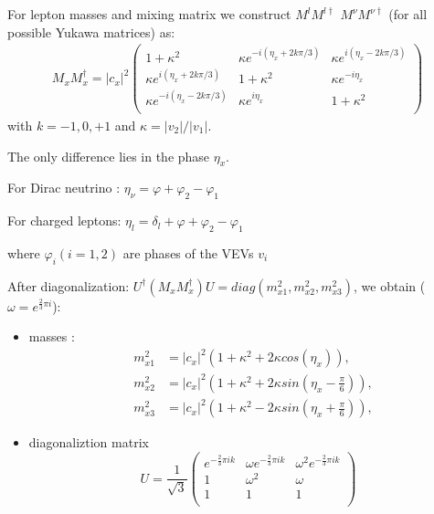 \documentclass{beamer}
\begin{document}
\begin{frame}
For lepton masses and mixing matrix we construct $M^l M^{l\dag}$ $M^\nu M^{\nu\dag}$ (for all possible Yukawa matrices) as:
\begin{eqnarray}
M_{x}M_{x}^{\dagger} =  \vert c_{x}|^2
\left(
\begin{array}{ccc}
  1+\kappa^{2} & \kappa e^{-i(\eta_{x} + 2 k \pi/3)} & \kappa e^{i(\eta_{x} - 2 k \pi/3)} \\
  \kappa e^{i(\eta_{x} + 2 k \pi/3)} & 1+\kappa^{2} & \kappa e^{-i \eta_{x}} \\
  \kappa e^{-i(\eta_{x} - 2 k \pi/3)} & \kappa e^{i\eta_{x}}& 1+\kappa^{2} \\
\end{array} \right)
\end{eqnarray}
with $k=-1,0,+1$ and $\kappa = \vert v_{2}\vert/\vert v_{1}\vert$.

\alert{The only difference lies in the phase $\eta_x$}.

For Dirac neutrino : $\eta_\nu=\varphi+\varphi_2-\varphi_1$

For charged leptons: $\eta_l=\delta_l+ \varphi+\varphi_2-\varphi_1$

where $\varphi_i (i=1,2)$ are phases of the  VEVs $v_i$
\end{frame}

\begin{frame}
After diagonalization: 
$ U^{\dagger} \left(M_{x} M_{x}^{\dagger}\right) U= diag\left(m_{x1}^{2},m_{x2}^{2},m_{x3}^{2}\right)$, we obtain ($\omega=e^{\frac{2}{3}\pi i}$):
\begin{itemize}
\item  masses : 
\begin{eqnarray}
&m_{x1}^{2}&  =  |c_{x}|^2 \left(1+\kappa^{2} + 2  \kappa  cos\left(\eta_{x}\right)\right),  \nonumber \\
&m_{x2}^{2}&  = |c_{x}|^2 \left(1+\kappa^{2} + 2  \kappa  sin\left(\eta_{x}-\frac{\pi}{6}\right)\right),  \nonumber \\
&m_{x3}^{2}&  = |c_{x}|^2 \left(1+\kappa^{2} - 2  \kappa  sin\left(\eta_{x}+\frac{\pi}{6}\right)\right), \nonumber 
\end{eqnarray}

\item diagonaliztion matrix
\begin{equation}
U =    \frac{1}{\sqrt{3}}\left(
\begin{array}{ccc}
  e^{- \frac{2}{3} \pi i k} & \omega e^{- \frac{2}{3} \pi i k} & \omega^{2} e^{- \frac{2}{3} \pi i k} \\
  1 & \omega^{2} & \omega \\
 1 & 1 & 1 \\ \nonumber
\end{array} \right)
\end{equation}
\end{itemize}
\end{frame}
\end{document}
